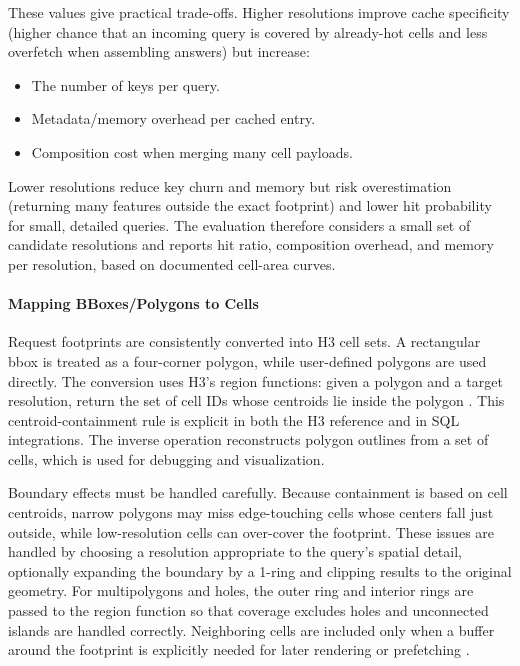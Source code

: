 These values give practical trade-offs. Higher resolutions improve cache specificity (higher chance that an incoming query is covered by already-hot cells and less overfetch when assembling answers) but increase:
\begin{itemize}
  \item The number of keys per query.
  \item Metadata/memory overhead per cached entry.
  \item Composition cost when merging many cell payloads.
\end{itemize}

Lower resolutions reduce key churn and memory but risk overestimation (returning many features outside the exact footprint) and lower hit probability for small, detailed queries. The evaluation therefore considers a small set of candidate resolutions and reports hit ratio, composition overhead, and memory per resolution, based on documented cell-area curves.

\paragraph{Mapping BBoxes/Polygons to Cells}
Request footprints are consistently converted into H3 cell sets. A rectangular \ac{bbox} is treated as a four-corner polygon, while user-defined polygons are used directly. The conversion uses H3's region functions: given a polygon and a target resolution, return the set of cell IDs whose centroids lie inside the polygon \cite{H3_API_Regions}. This centroid-containment rule is explicit in both the H3 reference and in SQL integrations. The inverse operation reconstructs polygon outlines from a set of cells, which is used for debugging and visualization.

Boundary effects must be handled carefully. Because containment is based on cell centroids, narrow polygons may miss edge-touching cells whose centers fall just outside, while low-resolution cells can over-cover the footprint. These issues are handled by choosing a resolution appropriate to the query's spatial detail, optionally expanding the boundary by a 1-ring and clipping results to the original geometry. For multipolygons and holes, the outer ring and interior rings are passed to the region function so that coverage excludes holes and unconnected islands are handled correctly. Neighboring cells are included only when a buffer around the footprint is explicitly needed for later rendering or prefetching \cite{H3_API_Traversal}.

